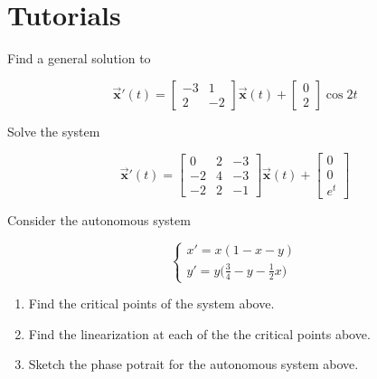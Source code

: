 \section{Tutorials}

\begin{mdframed}
    \vspace{-0.25cm}
    \hspace{-0.25cm}
    \begin{Exercise}
        Find a general solution to 

        \[
            \overrightarrow{\mathbf{x}}'(t) = \begin{bmatrix}
                -3 & 1 \\ 2 & -2
            \end{bmatrix} \overrightarrow{\mathbf{x}}(t) + \begin{bmatrix}
                0 \\ 2
            \end{bmatrix} \cos 2t
        \]
    \end{Exercise}

    \begin{Exercise}
        Solve the system

        \[
            \overrightarrow{\mathbf{x}}'(t) = \begin{bmatrix}
                0 & 2 & -3 \\ -2 & 4 & -3 \\ -2 & 2 & -1
            \end{bmatrix} \overrightarrow{\mathbf{x}}(t) + \begin{bmatrix}
                0 \\ 0 \\ e^t
            \end{bmatrix}
        \]
    \end{Exercise}


    \begin{Exercise}
        Consider the autonomous system

        \[
            \begin{cases}
                x' = x(1 - x - y)\\
                y' = \displaystyle y\biggl(\frac{3}{4} - y -\frac{1}{2}x \biggr)
            \end{cases}
        \]

        \begin{enumerate}
            \item Find the critical points of the system above.
            \item Find the linearization at each of the the critical points above.
            \item Sketch the phase potrait for the autonomous system above.
        \end{enumerate}
    \end{Exercise}
\end{mdframed}